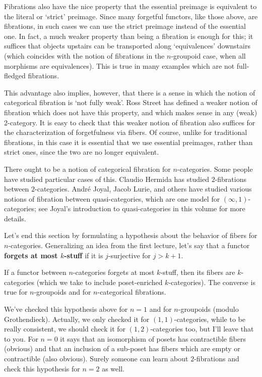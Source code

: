 \documentclass{amsart}
\begin{document}
Fibrations also have the nice property that the essential preimage is
equivalent to the literal or `strict' preimage.  Since many forgetful
functors, like those above, are fibrations, in such cases we can use
the strict preimage instead of the essential one.  In fact, a much
weaker property than being a fibration is enough for this; it suffices
that objects upstairs can be transported along `equivalences'
downstairs (which coincides with the notion of fibrations in the
$n$-groupoid case, when all morphisms are equivalences).  This is true
in many examples which are not full-fledged fibrations.

This advantage also implies, however, that there is a sense in which
the notion of categorical fibration is `not fully weak'.  Ross Street
has defined a weaker notion of fibration which does not have this
property, and which makes sense in any (weak) 2-category.  It is easy
to check that this weaker notion of fibration also suffices for the
characterization of forgetfulness via fibers.  Of course, unlike for
traditional fibrations, in this case it is essential that we use
essential preimages, rather than strict ones, since the two are no
longer equivalent.

There ought to be a notion of categorical fibration for
$n$-categories.  Some people have studied particular cases of this.
Claudio Hermida has studied $2$-fibrations between $2$-categories.
Andr\'e Joyal, Jacob Lurie, and others have studied various notions of
fibration between quasi-categories, which are one model for
$(\infty,1)$-categories; see Joyal's introduction to quasi-categories
in this volume for more details.

Let's end this section by formulating a hypothesis about the behavior
of fibers for $n$-categories.  Generalizing an idea from the first
lecture, let's say that a functor \textbf{forgets at most $k$-stuff}
if it is $j$-surjective for $j>k+1$.

\begin{hyp}
  If a functor between $n$-categories forgets at most $k$-stuff, then
  its fibers are $k$-categories (which we take to include
  poset-enriched $k$-categories).  The converse is true for
  $n$-groupoids and for $n$-categorical fibrations.
\end{hyp}

We've checked this hypothesis above for $n=1$ and for $n$-groupoids
(modulo Grothendieck).  Actually, we only checked it for
$(1,1)$-categories, while to be really consistent, we should check it
for $(1,2)$-categories too, but I'll leave that to you.  For $n=0$ it
says that an isomorphism of posets has contractible fibers (obvious)
and that an inclusion of a sub-poset has fibers which are empty or
contractible (also obvious).  Surely someone can learn about
$2$-fibrations and check this hypothesis for $n=2$ as well.
\end{document}
